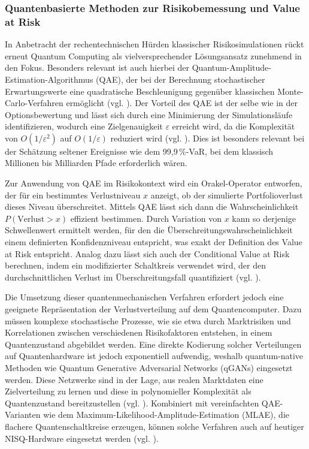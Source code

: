\subsubsection*{Quantenbasierte Methoden zur Risikobemessung und Value at Risk}

In Anbetracht der rechentechnischen Hürden klassischer Risikosimulationen rückt erneut Quantum Computing als vielversprechender Lösungsansatz zunehmend in den Fokus. Besonders relevant ist auch hierbei der Quantum-Amplitude-Estimation-Algorithmus (QAE), der bei der Berechnung stochastischer Erwartungswerte eine quadratische Beschleunigung gegenüber klassischen Monte-Carlo-Verfahren ermöglicht (vgl. \cite{stamatopoulos_option_2020, rebentrost_quantum_2018}). Der Vorteil des QAE ist der selbe wie in der Optionsbewertung und lässt sich durch eine Minimierung der Simulationsläufe identifizieren, wodurch eine Zielgenauigkeit $\varepsilon$ erreicht wird, da die Komplexität von $O(1/\varepsilon^2)$ auf $O(1/\varepsilon)$ reduziert wird (vgl. \cite{martin_new_2025}). Dies ist besonders relevant bei der Schätzung seltener Ereignisse wie dem 99{,}9\,\%-VaR, bei dem klassisch Millionen bis Milliarden Pfade erforderlich wären.

Zur Anwendung von QAE im Risikokontext wird ein Orakel-Operator entworfen, der für ein bestimmtes Verlustniveau $x$ anzeigt, ob der simulierte Portfolioverlust dieses Niveau überschreitet. Mittels QAE lässt sich dann die Wahrscheinlichkeit $P(\text{Verlust} > x)$ effizient bestimmen. Durch Variation von $x$ kann so derjenige Schwellenwert ermittelt werden, für den die Überschreitungswahrscheinlichkeit einem definierten Konfidenzniveau entspricht, was exakt der Definition des Value at Risk entspricht. Analog dazu lässt sich auch der Conditional Value at Risk berechnen, indem ein modifizierter Schaltkreis verwendet wird, der den durchschnittlichen Verlust im Überschreitungsfall quantifiziert (vgl. \cite{orus_quantum_2019, egger_quantum_2020}).

Die Umsetzung dieser quantenmechanischen Verfahren erfordert jedoch eine geeignete Repräsentation der Verlustverteilung auf dem Quantencomputer. Dazu müssen komplexe stochastische Prozesse, wie sie etwa durch Marktrisiken und Korrelationen zwischen verschiedenen Risikofaktoren entstehen, in einem Quantenzustand abgebildet werden. Eine direkte Kodierung solcher Verteilungen auf Quantenhardware ist jedoch exponentiell aufwendig, weshalb quantum-native Methoden wie Quantum Generative Adversarial Networks (qGANs) eingesetzt werden. Diese Netzwerke sind in der Lage, aus realen Marktdaten eine Zielverteilung zu lernen und diese in polynomieller Komplexität als Quantenzustand bereitzustellen (vgl. \cite{zoufal_quantum_2019}). Kombiniert mit vereinfachten QAE-Varianten wie dem Maximum-Likelihood-Amplitude-Estimation (MLAE), die flachere Quantenschaltkreise erzeugen, können solche Verfahren auch auf heutiger NISQ-Hardware eingesetzt werden (vgl. \cite{stamatopoulos_option_2020}).

